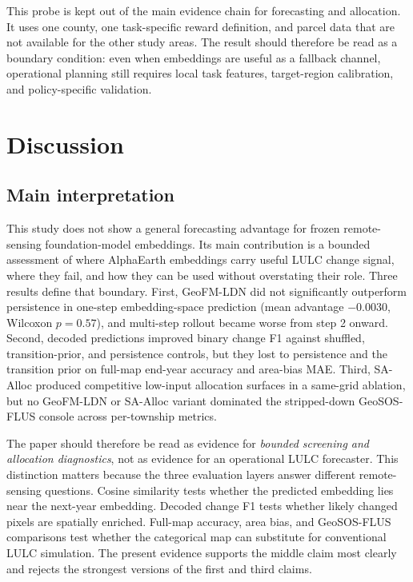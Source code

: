 \documentclass{article}
\begin{document}
This probe is kept out of the main evidence chain for forecasting and allocation. It uses one county, one task-specific reward definition, and parcel data that are not available for the other study areas. The result should therefore be read as a boundary condition: even when embeddings are useful as a fallback channel, operational planning still requires local task features, target-region calibration, and policy-specific validation.

\section{Discussion}
\label{sec:discussion}

\subsection{Main interpretation}

This study does not show a general forecasting advantage for frozen remote-sensing foundation-model embeddings. Its main contribution is a bounded assessment of where AlphaEarth embeddings carry useful LULC change signal, where they fail, and how they can be used without overstating their role. Three results define that boundary. First, GeoFM-LDN did not significantly outperform persistence in one-step embedding-space prediction (mean advantage $-0.0030$, Wilcoxon $p=0.57$), and multi-step rollout became worse from step 2 onward. Second, decoded predictions improved binary change F1 against shuffled, transition-prior, and persistence controls, but they lost to persistence and the transition prior on full-map end-year accuracy and area-bias MAE. Third, SA-Alloc produced competitive low-input allocation surfaces in a same-grid ablation, but no GeoFM-LDN or SA-Alloc variant dominated the stripped-down GeoSOS-FLUS console across per-township metrics.

The paper should therefore be read as evidence for \emph{bounded screening and allocation diagnostics}, not as evidence for an operational LULC forecaster. This distinction matters because the three evaluation layers answer different remote-sensing questions. Cosine similarity tests whether the predicted embedding lies near the next-year embedding. Decoded change F1 tests whether likely changed pixels are spatially enriched. Full-map accuracy, area bias, and GeoSOS-FLUS comparisons test whether the categorical map can substitute for conventional LULC simulation. The present evidence supports the middle claim most clearly and rejects the strongest versions of the first and third claims.
\end{document}
